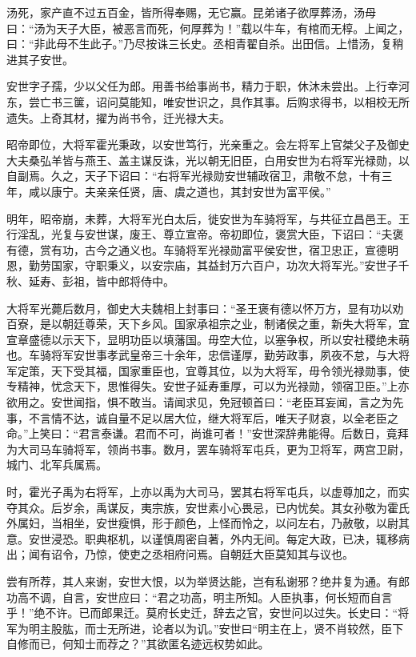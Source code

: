 \documentclass[]{article}
\begin{document}
汤死，家产直不过五百金，皆所得奉赐，无它赢。昆弟诸子欲厚葬汤，汤母曰：``汤为天子大臣，被恶言而死，何厚葬为！''载以牛车，有棺而无椁。上闻之，曰：``非此母不生此子。''乃尽按诛三长史。丞相青翟自杀。出田信。上惜汤，复稍进其子安世。

安世字子孺，少以父任为郎。用善书给事尚书，精力于职，休沐未尝出。上行幸河东，尝亡书三箧，诏问莫能知，唯安世识之，具作其事。后购求得书，以相校无所遗失。上奇其材，擢为尚书令，迁光禄大夫。

昭帝即位，大将军霍光秉政，以安世笃行，光亲重之。会左将军上官桀父子及御史大夫桑弘羊皆与燕王、盖主谋反诛，光以朝无旧臣，白用安世为右将军光禄勋，以自副焉。久之，天子下诏曰：``右将军光禄勋安世辅政宿卫，肃敬不怠，十有三年，咸以康宁。夫亲亲任贤，唐、虞之道也，其封安世为富平侯。''

明年，昭帝崩，未葬，大将军光白太后，徙安世为车骑将军，与共征立昌邑王。王行淫乱，光复与安世谋，废王、尊立宣帝。帝初即位，褒赏大臣，下诏曰：``夫褒有德，赏有功，古今之通义也。车骑将军光禄勋富平侯安世，宿卫忠正，宣德明恩，勤劳国家，守职秉义，以安宗庙，其益封万六百户，功次大将军光。''安世子千秋、延寿、彭祖，皆中郎将侍中。

大将军光薨后数月，御史大夫魏相上封事曰：``圣王褒有德以怀万方，显有功以劝百寮，是以朝廷尊荣，天下乡风。国家承祖宗之业，制诸侯之重，新失大将军，宜宣章盛德以示天下，显明功臣以填藩国。毋空大位，以塞争权，所以安社稷绝未萌也。车骑将军安世事孝武皇帝三十余年，忠信谨厚，勤劳政事，夙夜不怠，与大将军定策，天下受其福，国家重臣也，宜尊其位，以为大将军，毋令领光禄勋事，使专精神，忧念天下，思惟得失。安世子延寿重厚，可以为光禄勋，领宿卫臣。''上亦欲用之。安世闻指，惧不敢当。请闻求见，免冠顿首曰：``老臣耳妄闻，言之为先事，不言情不达，诚自量不足以居大位，继大将军后，唯天子财哀，以全老臣之命。''上笑曰：``君言泰谦。君而不可，尚谁可者！''安世深辞弗能得。后数日，竟拜为大司马车骑将军，领尚书事。数月，罢车骑将军屯兵，更为卫将军，两宫卫尉，城门、北军兵属焉。

时，霍光子禹为右将军，上亦以禹为大司马，罢其右将军屯兵，以虚尊加之，而实夺其众。后岁余，禹谋反，夷宗族，安世素小心畏忌，已内忧矣。其女孙敬为霍氏外属妇，当相坐，安世瘦惧，形于颜色，上怪而怜之，以问左右，乃赦敬，以尉其意。安世浸恐。职典枢机，以谨慎周密自著，外内无间。每定大政，已决，辄移病出；闻有诏令，乃惊，使吏之丞相府问焉。自朝廷大臣莫知其与议也。

尝有所荐，其人来谢，安世大恨，以为举贤达能，岂有私谢邪？绝井复为通。有郎功高不调，自言，安世应曰：``君之功高，明主所知。人臣执事，何长短而自言乎！''绝不许。已而郎果迁。莫府长史迁，辞去之官，安世问以过失。长史曰：``将军为明主股肱，而士无所进，论者以为讥。''安世曰``明主在上，贤不肖较然，臣下自修而已，何知士而荐之？''其欲匿名迹远权势如此。
\end{document}
